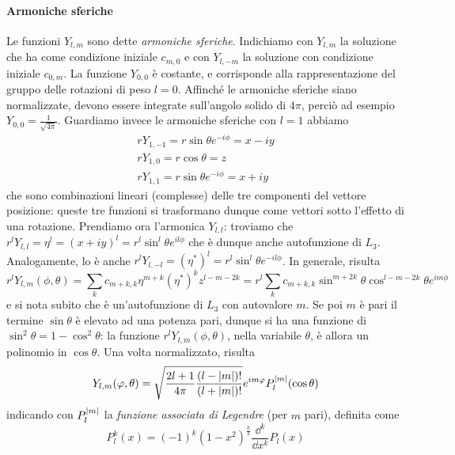 \paragraph{Armoniche sferiche}
Le funzioni $Y_{l,m}$ sono dette \emph{armoniche sferiche}.
Indichiamo con $Y_{l,m}$ la soluzione che ha come condizione iniziale $c_{m,0}$ e con $Y_{l,-m}$ la soluzione con condizione iniziale $c_{0,m}$.
La funzione $Y_{0,0}$ è costante, e corrisponde alla rappresentazione del gruppo delle rotazioni di peso $l=0$.
Affinch\'e le armoniche sferiche siano normalizzate, devono essere integrate sull'angolo solido di $4\pi$, perciò ad esempio $Y_{0,0}=\frac1{\sqrt{4\pi}}$.
Guardiamo invece le armoniche sferiche con $l=1$ abbiamo
\begin{equation}
	\begin{aligned}
		rY_{1,-1}=r\sin\theta e^{-i\phi}=x-iy\\
		rY_{1,0}=r\cos\theta=z\\
		rY_{1,1}=r\sin\theta e^{-i\phi}=x+iy
	\end{aligned}
	\label{eq:armoniche-sferiche-1}
\end{equation}
che sono combinazioni lineari (complesse) delle tre componenti del vettore posizione: queste tre funzioni si trasformano dunque come vettori sotto l'effetto di una rotazione.
Prendiamo ora l'armonica $Y_{l,l}$: troviamo che $r^lY_{l,l}=\eta^l=(x+iy)^l=r^l\sin^l\theta e^{il\phi}$ che è dunque anche autofunzione di $L_3$.
Analogamente, lo è anche $r^lY_{l,-l}=(\eta^*)^l=r^l\sin^l\theta e^{-il\phi}$.
In generale, risulta
\begin{equation}
	r^lY_{l,m}(\phi,\theta)=\sum_kc_{m+k,k}\eta^{m+k}(\eta^*)^kz^{l-m-2k}=r^l\sum_kc_{m+k,k}\sin^{m+2k}\theta\cos^{l-m-2k}\theta e^{im\phi}
\end{equation}
e si nota subito che è un'autofunzione di $L_3$ con autovalore $m$.
Se poi $m$ è pari il termine $\sin\theta$ è elevato ad una potenza pari, dunque si ha una funzione di $\sin^2\theta=1-\cos^2\theta$: la funzione $r^lY_{l,m}(\phi,\theta)$, nella variabile $\theta$, è allora un polinomio in $\cos\theta$.
Una volta normalizzato, risulta
\begin{equation}
	Y_{l,m}(\varphi,\theta)=\sqrt{\frac{2l+1}{4\pi}\frac{(l-\lvert m\rvert)!}{(l+\lvert m\rvert)!}}e^{im\varphi}P_l^{\lvert m\rvert}(\cos\theta)
	\label{eq:armoniche-sferiche-funzioni-associate-legendre}
\end{equation}
indicando con $P_l^{\lvert m\rvert}$ la \emph{funzione associata di Legendre} (per $m$ pari), definita come
\begin{equation}
	P_l^k(x)=(-1)^k(1-x^2)^{\frac{k}2}\frac{\dd^k}{\dd x^k}P_l(x)
	\label{eq:funzione-associata-legendre}
\end{equation}
